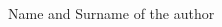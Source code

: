 \begin{acknowledgements}
\setlength{\parskip}{12pt}
\setlength{\parindent}{10mm}
\onehalfspacing

\lipsum[1-3] %

\begin{spacing}{4}
\end{spacing}
\hfill Name and Surname of the author
\end{acknowledgements}
